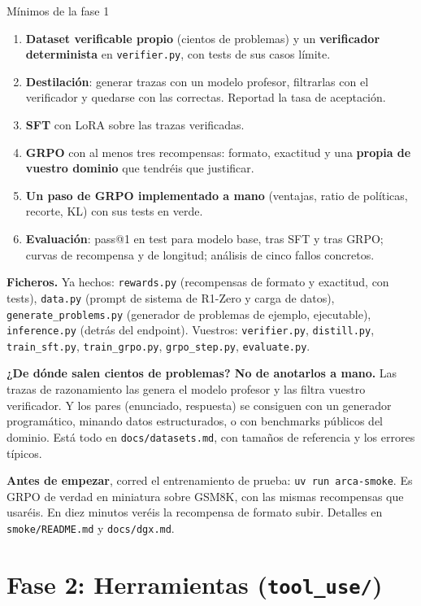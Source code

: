 \documentclass[11pt,a4paper]{article}
\newcommand{\code}[1]{{\small\texttt{#1}}}
\newcommand{\file}[1]{{\small\texttt{\textcolor{arcablue}{#1}}}}
\begin{document}
\begin{minimos}{Mínimos de la fase 1}
\begin{enumerate}
  \item \textbf{Dataset verificable propio} (cientos de problemas) y un \textbf{verificador
  determinista} en \file{verifier.py}, con tests de sus casos límite.
  \item \textbf{Destilación}: generar trazas con un modelo profesor, filtrarlas con el
  verificador y quedarse con las correctas. Reportad la tasa de aceptación.
  \item \textbf{SFT} con LoRA sobre las trazas verificadas.
  \item \textbf{GRPO} con al menos tres recompensas: formato, exactitud y una
  \textbf{propia de vuestro dominio} que tendréis que justificar.
  \item \textbf{Un paso de GRPO implementado a mano} (ventajas, ratio de políticas, recorte,
  KL) con sus tests en verde.
  \item \textbf{Evaluación}: pass@1 en test para modelo base, tras SFT y tras GRPO; curvas de
  recompensa y de longitud; análisis de cinco fallos concretos.
\end{enumerate}
\end{minimos}

\textbf{Ficheros.} Ya hechos: \file{rewards.py} (recompensas de formato y exactitud, con
tests), \file{data.py} (prompt de sistema de R1-Zero y carga de datos),
\file{generate\_problems.py} (generador de problemas de ejemplo, ejecutable),
\file{inference.py} (detrás del endpoint). Vuestros: \file{verifier.py}, \file{distill.py},
\file{train\_sft.py}, \file{train\_grpo.py}, \file{grpo\_step.py}, \file{evaluate.py}.

\textbf{¿De dónde salen cientos de problemas? No de anotarlos a mano.} Las trazas de
razonamiento las genera el modelo profesor y las filtra vuestro verificador. Y los pares
(enunciado, respuesta) se consiguen con un generador programático, minando datos
estructurados, o con benchmarks públicos del dominio. Está todo en
\file{docs/datasets.md}, con tamaños de referencia y los errores típicos.

\textbf{Antes de empezar}, corred el entrenamiento de prueba: \code{uv run arca-smoke}. Es
GRPO de verdad en miniatura sobre GSM8K, con las mismas recompensas que usaréis. En diez
minutos veréis la recompensa de formato subir. Detalles en \file{smoke/README.md} y
\file{docs/dgx.md}.

\section{Fase 2: Herramientas (\file{tool\_use/})}
\end{document}
